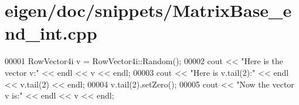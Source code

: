\hypertarget{eigen_2doc_2snippets_2_matrix_base__end__int_8cpp_source}{}\section{eigen/doc/snippets/\+Matrix\+Base\+\_\+end\+\_\+int.cpp}
\label{eigen_2doc_2snippets_2_matrix_base__end__int_8cpp_source}

\begin{DoxyCode}
00001 RowVector4i v = RowVector4i::Random();
00002 cout << \textcolor{stringliteral}{"Here is the vector v:"} << endl << v << endl;
00003 cout << \textcolor{stringliteral}{"Here is v.tail(2):"} << endl << v.tail(2) << endl;
00004 v.tail(2).setZero();
00005 cout << \textcolor{stringliteral}{"Now the vector v is:"} << endl << v << endl;
\end{DoxyCode}
